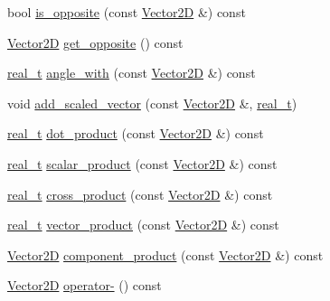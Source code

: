 \begin{DoxyCompactItemize}
\item 
bool \hyperlink{class_designar_1_1_vector2_d_a9727d5c0b45f64710c43943083286057}{is\+\_\+opposite} (const \hyperlink{class_designar_1_1_vector2_d}{Vector2D} \&) const
\item 
\hyperlink{class_designar_1_1_vector2_d}{Vector2D} \hyperlink{class_designar_1_1_vector2_d_a77346dfbaa8d957a56a157f856b5d64c}{get\+\_\+opposite} () const
\item 
\hyperlink{namespace_designar_aca2c32af26808dbec1f3a3071fad25ce}{real\+\_\+t} \hyperlink{class_designar_1_1_vector2_d_a6ae509f647b36962b28888326d4be4ee}{angle\+\_\+with} (const \hyperlink{class_designar_1_1_vector2_d}{Vector2D} \&) const
\item 
void \hyperlink{class_designar_1_1_vector2_d_a2ebd9f7249418ab305fb1a50e590c82b}{add\+\_\+scaled\+\_\+vector} (const \hyperlink{class_designar_1_1_vector2_d}{Vector2D} \&, \hyperlink{namespace_designar_aca2c32af26808dbec1f3a3071fad25ce}{real\+\_\+t})
\item 
\hyperlink{namespace_designar_aca2c32af26808dbec1f3a3071fad25ce}{real\+\_\+t} \hyperlink{class_designar_1_1_vector2_d_a1bf8a1027cbbfa0b63942821a85d5b93}{dot\+\_\+product} (const \hyperlink{class_designar_1_1_vector2_d}{Vector2D} \&) const
\item 
\hyperlink{namespace_designar_aca2c32af26808dbec1f3a3071fad25ce}{real\+\_\+t} \hyperlink{class_designar_1_1_vector2_d_aef525ee7bd5b44f14dbc7b47dd4e90c3}{scalar\+\_\+product} (const \hyperlink{class_designar_1_1_vector2_d}{Vector2D} \&) const
\item 
\hyperlink{namespace_designar_aca2c32af26808dbec1f3a3071fad25ce}{real\+\_\+t} \hyperlink{class_designar_1_1_vector2_d_a2507693c9fa2c76208677e3a9effe17c}{cross\+\_\+product} (const \hyperlink{class_designar_1_1_vector2_d}{Vector2D} \&) const
\item 
\hyperlink{namespace_designar_aca2c32af26808dbec1f3a3071fad25ce}{real\+\_\+t} \hyperlink{class_designar_1_1_vector2_d_a7178922760e7bf32bf1dbfe4f843ba52}{vector\+\_\+product} (const \hyperlink{class_designar_1_1_vector2_d}{Vector2D} \&) const
\item 
\hyperlink{class_designar_1_1_vector2_d}{Vector2D} \hyperlink{class_designar_1_1_vector2_d_a18e57037a18647f59d0279e241094706}{component\+\_\+product} (const \hyperlink{class_designar_1_1_vector2_d}{Vector2D} \&) const
\item 
\hyperlink{class_designar_1_1_vector2_d}{Vector2D} \hyperlink{class_designar_1_1_vector2_d_a3f08d4ef71803330670d2998f8c48f3f}{operator-\/} () const

\end{DoxyCompactItemize}
